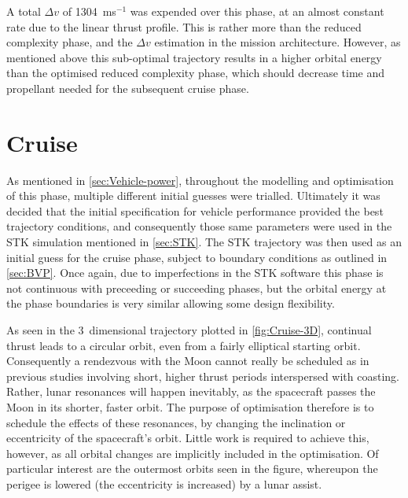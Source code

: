 A total $\Delta v$ of 1304~ms$^{-1}$ was expended over this phase, at an almost constant rate due to the linear thrust profile. This is rather more than the reduced complexity phase, and the $\Delta v$ estimation in the mission architecture. However, as mentioned above this sub-optimal trajectory results in a higher orbital energy than the optimised reduced complexity phase, which should decrease time and propellant needed for the subsequent cruise phase.



\clearpage


\section{Cruise} \label{sec:Cruise}
As mentioned in \autoref{sec:Vehicle-power}, throughout the modelling and optimisation of this phase, multiple different initial guesses were trialled. Ultimately it was decided that the initial specification for vehicle performance provided the best trajectory conditions, and consequently those same parameters were used in the STK simulation mentioned in \autoref{sec:STK}. The STK trajectory was then used as an initial guess for the cruise phase, subject to boundary conditions as outlined in \autoref{sec:BVP}. Once again, due to imperfections in the STK software this phase is not continuous with preceeding or succeeding phases, but the orbital energy at the phase boundaries is very similar allowing some design flexibility.

As seen in the 3~dimensional trajectory plotted in \autoref{fig:Cruise-3D}, continual thrust leads to a circular orbit, even from a fairly elliptical starting orbit. Consequently a rendezvous with the Moon cannot really be scheduled as in previous studies involving short, higher thrust periods interspersed with coasting. Rather, lunar resonances will happen inevitably, as the spacecraft passes the Moon in its shorter, faster orbit. The purpose of optimisation therefore is to schedule the effects of these resonances, by changing the inclination or eccentricity of the spacecraft's orbit. Little work is required to achieve this, however, as all orbital changes are implicitly included in the optimisation. Of particular interest are the outermost orbits seen in the figure, whereupon the perigee is lowered (the eccentricity is increased) by a lunar assist.


